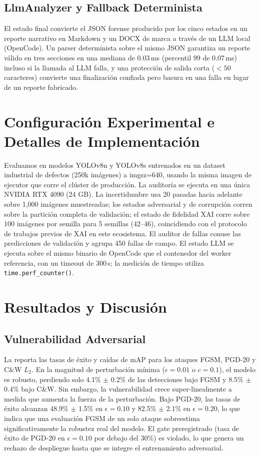 \documentclass[10pt,twocolumn,letterpaper]{article}
\begin{document}
\subsection{LlmAnalyzer y Fallback Determinista}
El estado final convierte el JSON forense producido por los cinco estados en un reporte narrativo en Markdown y un DOCX de marca a través de un LLM local (OpenCode). Un parser determinista sobre el mismo JSON garantiza un reporte válido en tres secciones en una mediana de 0.03\,ms (percentil 99 de 0.07\,ms) incluso si la llamada al LLM falla, y una protección de salida corta ($<50$ caracteres) convierte una finalización confiada pero basura en una falla en lugar de un reporte fabricado.

\section{Configuración Experimental e Detalles de Implementación}
\label{sec:exp}
Evaluamos en modelos YOLOv8n y YOLOv8s entrenados en un dataset industrial de defectos (250k imágenes) a imgsz=640, usando la misma imagen de ejecutor que corre el clúster de producción. La auditoría se ejecuta en una única NVIDIA RTX 4090 (24 GB). La incertidumbre usa 20 pasadas hacia adelante sobre 1,000 imágenes muestreadas; los estados adversarial y de corrupción corren sobre la partición completa de validación; el estado de fidelidad XAI corre sobre 100 imágenes por semilla para 5 semillas (42--46), coincidiendo con el protocolo de trabajos previos de XAI en este ecosistema. El auditor de fallas conuse las predicciones de validación y agrupa 450 fallas de campo. El estado LLM se ejecuta sobre el mismo binario de OpenCode que el contenedor del worker referencia, con un timeout de 300\,s; la medición de tiempo utiliza \texttt{time.perf\_counter()}.

\section{Resultados y Discusión}
\label{sec:results}

\subsection{Vulnerabilidad Adversarial}
La  reporta las tasas de éxito y caídas de mAP para los ataques FGSM, PGD-20 y C\&W $L_2$. En la magnitud de perturbación mínima ($\epsilon=0.01$ o $c=0.1$), el modelo es robusto, perdiendo solo 4.1\% $\pm$ 0.2\% de las detecciones bajo FGSM y 8.5\% $\pm$ 0.4\% bajo C\&W. Sin embargo, la vulnerabilidad crece super-linealmente a medida que aumenta la fuerza de la perturbación. Bajo PGD-20, las tasas de éxito alcanzan 48.9\% $\pm$ 1.5\% en $\epsilon=0.10$ y 82.5\% $\pm$ 2.1\% en $\epsilon=0.20$, lo que indica que una evaluación FGSM de un solo ataque sobreestima significativamente la robustez real del modelo. El gate preregistrado (tasa de éxito de PGD-20 en $\epsilon=0.10$ por debajo del 30\%) es violado, lo que genera un rechazo de despliegue hasta que se integre el entrenamiento adversarial.
\end{document}
